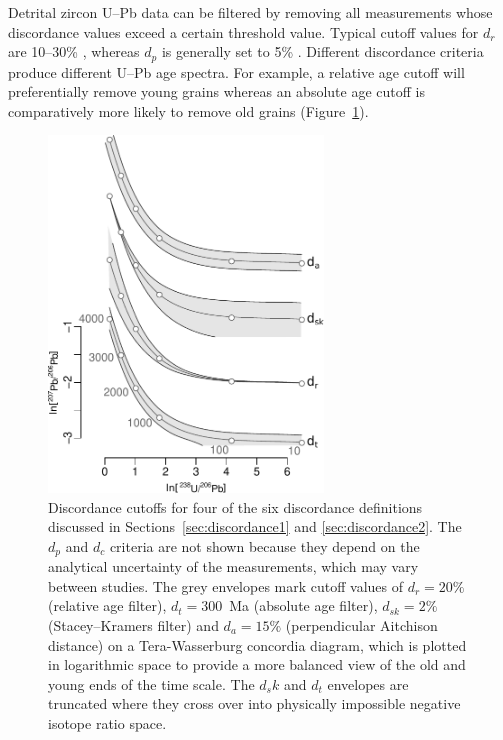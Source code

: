 \documentclass[gchron, manuscript]{copernicus}
\begin{document}
Detrital zircon U--Pb data can be filtered by removing all
measurements whose discordance values exceed a certain threshold
value. Typical cutoff values for $d_r$ are 10--30\%
\citep{gehrels2011}, whereas $d_p$ is generally set to 5\%
\citep{spencer2016}. Different discordance criteria produce different
U--Pb age spectra. For example, a relative age cutoff will
preferentially remove young grains whereas an absolute age cutoff is
comparatively more likely to remove old grains
(Figure~\ref{fig:agediscordance}).

\begin{figure}[t]
  \includegraphics[width=7.3cm]{TW-option-1234.pdf}
  \caption{Discordance cutoffs for four of the six discordance
    definitions discussed in Sections~\ref{sec:discordance1} and
    \ref{sec:discordance2}. The $d_{p}$ and $d_c$ criteria are not
    shown because they depend on the analytical uncertainty of the
    measurements, which may vary between studies. The grey envelopes
    mark cutoff values of $d_r=20\%$ (relative age filter),
    $d_t=300$~Ma (absolute age filter), $d_{sk}=2\%$ (Stacey--Kramers
    filter) and $d_{a}=15\%$ (perpendicular Aitchison distance) on a
    Tera-Wasserburg concordia diagram, which is plotted in logarithmic
    space to provide a more balanced view of the old and young ends of
    the time scale. The $d_sk$ and $d_t$ envelopes are truncated where
    they cross over into physically impossible negative isotope ratio
    space.}
  \label{fig:agediscordance}
\end{figure}
\end{document}
